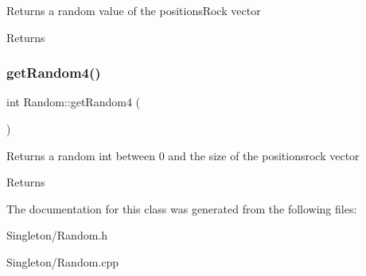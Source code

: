Returns a random value of the positions\+Rock vector \begin{DoxyReturn}{Returns}

\end{DoxyReturn}
\mbox{\label{classRandom_a4046851c0a4a16d47bde664b47007927}} 
\subsubsection{\texorpdfstring{get\+Random4()}{getRandom4()}}
{\footnotesize\ttfamily int Random\+::get\+Random4 (\begin{DoxyParamCaption}{ }\end{DoxyParamCaption})}

Returns a random int between 0 and the size of the positionsrock vector \begin{DoxyReturn}{Returns}

\end{DoxyReturn}


The documentation for this class was generated from the following files\+:\begin{DoxyCompactItemize}
\item 
Singleton/Random.\+h\item 
Singleton/Random.\+cpp\end{DoxyCompactItemize}
